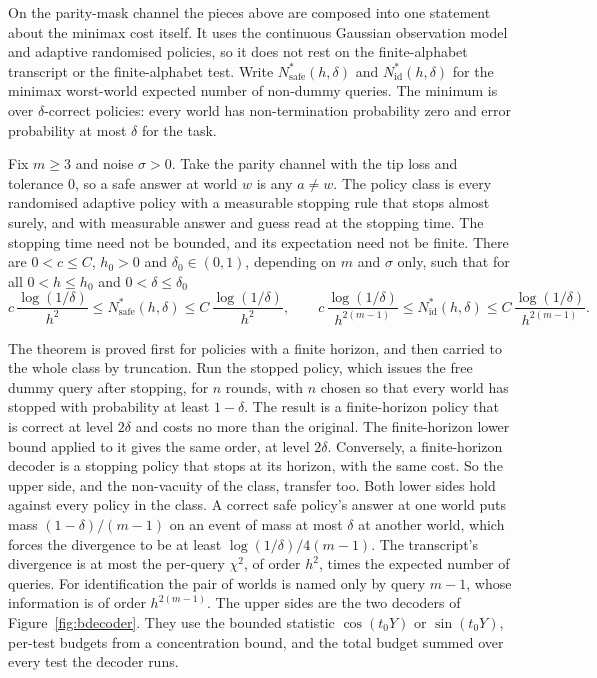 On the parity-mask channel the pieces above are composed into one statement about the
minimax cost itself. It uses the continuous Gaussian observation model and adaptive
randomised policies, so it does not rest on the finite-alphabet transcript or the
finite-alphabet test. Write $N^{*}_{\mathrm{safe}}(h,\delta)$ and $N^{*}_{\mathrm{id}}(h,\delta)$
for the minimax worst-world expected number of non-dummy queries. The minimum is over
$\delta$-correct policies: every world has non-termination probability zero and error
probability at most $\delta$ for the task.

\begin{theorem}
\label{thm:endpoint}
Fix $m\ge3$ and noise $\sigma>0$. Take the parity channel with the tip loss and tolerance
$0$, so a safe answer at world $w$ is any $a\ne w$. The policy class is every randomised
adaptive policy with a measurable stopping rule that stops almost surely, and with
measurable answer and guess read at the stopping time. The stopping time need not be
bounded, and its expectation need not be finite. There are
$0<c\le C$, $h_{0}>0$ and $\delta_{0}\in(0,1)$, depending on $m$ and $\sigma$ only, such that
for all $0<h\le h_{0}$ and $0<\delta\le\delta_{0}$
\[
c\,\frac{\log(1/\delta)}{h^{2}}\le N^{*}_{\mathrm{safe}}(h,\delta)\le C\,\frac{\log(1/\delta)}{h^{2}},
\qquad
c\,\frac{\log(1/\delta)}{h^{2(m-1)}}\le N^{*}_{\mathrm{id}}(h,\delta)\le C\,\frac{\log(1/\delta)}{h^{2(m-1)}} .
\]
\end{theorem}

The theorem is proved first for policies with a finite horizon, and then carried to the
whole class by truncation. Run the stopped policy, which issues the free dummy query after
stopping, for $n$ rounds, with $n$ chosen so that every world has stopped with probability at
least $1-\delta$. The result is a finite-horizon policy that is correct at level $2\delta$ and
costs no more than the original. The finite-horizon lower bound applied to it gives the same
order, at level $2\delta$. Conversely, a finite-horizon decoder is a stopping policy that
stops at its horizon, with the same cost. So the upper side, and the non-vacuity of the
class, transfer too. Both lower sides hold against every policy in the class. A correct safe policy's answer at
one world puts mass $(1-\delta)/(m-1)$ on an event of mass at most $\delta$ at another world,
which forces the divergence to be at least $\log(1/\delta)/4(m-1)$. The transcript's
divergence is at most the per-query $\chi^{2}$, of order $h^{2}$, times the expected number of
queries. For identification the pair of worlds is named only by query $m-1$, whose
information is of order $h^{2(m-1)}$. The upper sides are the two decoders of
Figure~\ref{fig:bdecoder}. They use the bounded statistic $\cos(t_{0}Y)$ or $\sin(t_{0}Y)$,
per-test budgets from a concentration bound, and the total budget summed over every test the
decoder runs.

